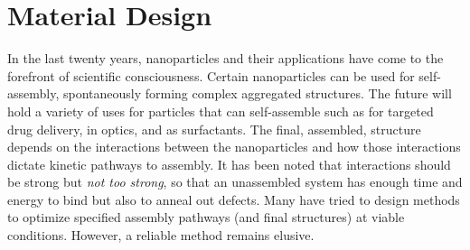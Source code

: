 \documentclass[11pt]{article}
\begin{document}


\section{Material Design}

In the last twenty years, nanoparticles and their applications have come to the forefront of scientific consciousness.
Certain nanoparticles can be used for self-assembly, spontaneously forming complex aggregated structures. The future will hold a variety of uses for particles that can self-assemble such as for targeted drug delivery,
in optics,
and as surfactants.
The final, assembled, structure depends on the interactions between the nanoparticles and how those interactions dictate kinetic pathways to assembly. It has been noted that interactions should be strong but {\it not too strong}, so that an unassembled system has enough time and energy to bind but also to anneal out defects.
Many have tried to design methods to optimize specified assembly pathways (and final structures) at viable conditions.  However, a reliable method remains elusive. 
\end{document}

